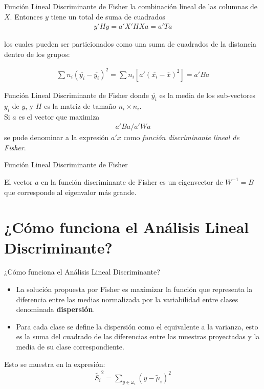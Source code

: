 \documentclass[11pt,aspectratio=169]{beamer}
\begin{document}
\begin{frame}{Función Lineal Discriminante de Fisher}
la combinación lineal de las columnas de $X$. Entonces $y$ tiene un total de suma de cuadrados\pause
\begin{align*}
	y'Hy = a'X'HXa = a'Ta
\end{align*}\pause

los cuales pueden ser particionados como una suma de cuadrados de la distancia dentro de los grupos:\pause

\begin{align*}
	\sum n_i(\overline{y_i} - \overline{y_i})^2 = \sum n_i \left[a'(\overline{x_i} - \overline{x})^2 \right] = a'Ba
\end{align*}
\end{frame}

\begin{frame}{Función Lineal Discriminante de Fisher}
donde $\overline{y_i}$ es la media de los sub-vectores $y_i$ de $y$, y $H$ es la matriz de tamaño $n_i\times n_i$.\\
Si $a$ es el vector que maximiza \pause
\begin{align*}
	a'Ba / a' Wa
\end{align*}
se pude denominar a la expresión $a'x$ como \textit{función discriminante lineal de Fisher}.
\end{frame}

\begin{frame}{Función Lineal Discriminante de Fisher}
\begin{theorem}
	El vector $a$ en la función discriminante de Fisher es un eigenvector de $W^{-1}=B$ que corresponde al eigenvalor más grande.
	\label{teo:Fisher}
\end{theorem}
\end{frame}


\section{¿Cómo funciona el Análisis Lineal Discriminante?}

\begin{frame}{¿Cómo funciona el Análisis Lineal Discriminante?}
\begin{itemize}
	\item La solución propuesta por Fisher es maximizar la función que representa la diferencia entre las medias normalizada por 
		la variabilidad entre clases denominada \textbf{dispersión}.\pause
	\item Para cada clase se define la dispersión como el equivalente a la varianza, esto es la suma del cuadrado de las diferencias 
		entre las muestras proyectadas y la media de su clase correspondiente. \pause
\end{itemize}
Esto  se muestra en la expresión:
\begin{align}
	\widetilde{S_i}^2 = \sum_{y\in \omega_i}(y-\widetilde{\mu}_i)^2
	\label{eq:var}
\end{align}
\end{frame}
\end{document}
